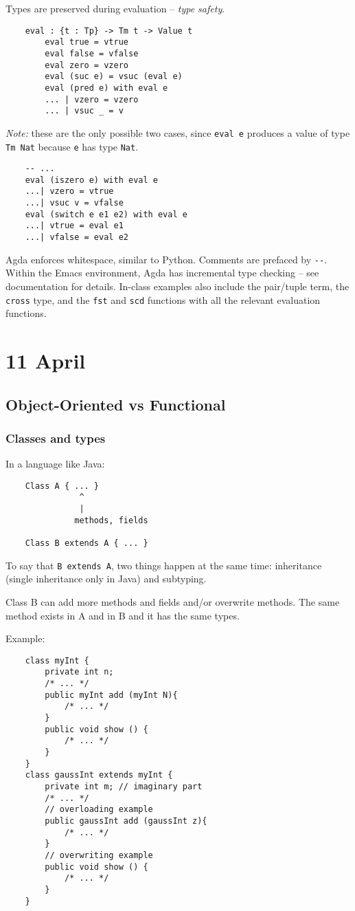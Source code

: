 \documentclass[11pt]{article}
\begin{document}
Types are preserved during evaluation -- \emph{type safety}.
\begin{verbatim}
    eval : {t : Tp} -> Tm t -> Value t
        eval true = vtrue
        eval false = vfalse
        eval zero = vzero
        eval (suc e) = vsuc (eval e)
        eval (pred e) with eval e
        ... | vzero = vzero
        ... | vsuc _ = v
\end{verbatim}
\emph{Note:} these are the only possible two cases, since \verb!eval e! produces a value of type \verb!Tm Nat! because \verb!e! has type \verb!Nat!.

\begin{verbatim}
    -- ...
    eval (iszero e) with eval e
    ...| vzero = vtrue
    ...| vsuc v = vfalse
    eval (switch e e1 e2) with eval e
    ...| vtrue = eval e1
    ...| vfalse = eval e2
\end{verbatim}

Agda enforces whitespace, similar to Python. Comments are prefaced by \verb~--~. Within the Emacs environment, Agda has incremental type checking -- see documentation for details. In-class examples also include the pair/tuple term, the \verb!cross! type, and the \verb!fst! and \verb!scd! functions with all the relevant evaluation functions.

\section{11 April}
\subsection{Object-Oriented vs Functional}
\subsubsection{Classes and types}
In a language like Java:
\begin{verbatim}
    Class A { ... }
               ^
               |
              methods, fields
    
    Class B extends A { ... }
\end{verbatim}
To say that \verb~B extends A~, two things happen at the same time: inheritance (single inheritance only in Java) and subtyping.

Class B can add more methods and fields and/or overwrite methods. The same method exists in A and in B and it has the same types.

Example:
\begin{verbatim}
    class myInt {
        private int n;
        /* ... */
        public myInt add (myInt N){
            /* ... */
        }
        public void show () {
            /* ... */
        }
    }
    class gaussInt extends myInt {
        private int m; // imaginary part
        /* ... */
        // overloading example
        public gaussInt add (gaussInt z){
            /* ... */
        }
        // overwriting example
        public void show () {
            /* ... */
        }
    }
\end{verbatim}
\end{document}
